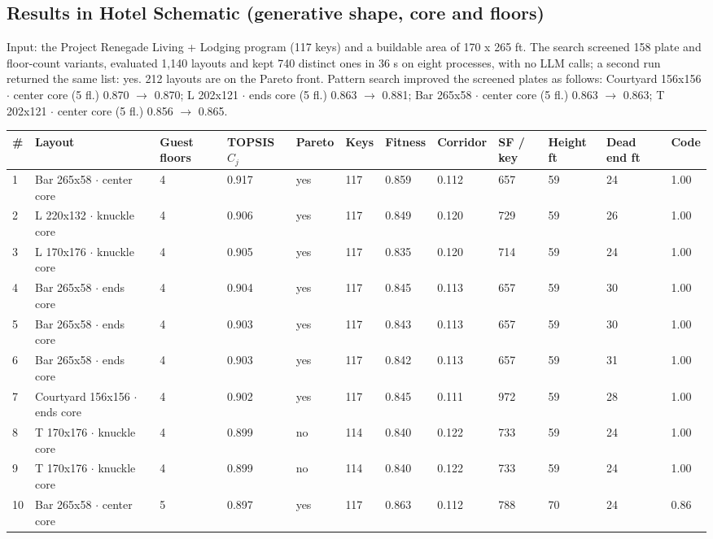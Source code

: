 \documentclass[10pt]{article}
\begin{document}
\subsection{Results in Hotel Schematic (generative shape, core and floors)}\label{sec:opthotel}
Input: the Project Renegade Living + Lodging program (117 keys) and a buildable area of
170 x 265 ft. The search screened 158 plate and floor-count variants,
evaluated 1,140 layouts and kept 740 distinct ones in 36 s on eight
processes, with no LLM calls; a second run returned the same list: yes.
212 layouts are on the Pareto front. Pattern search improved the screened plates as follows:
Courtyard 156x156 $\cdot$ center core (5 fl.) 0.870 $\to$ 0.870; L 202x121 $\cdot$ ends core (5 fl.) 0.863 $\to$ 0.881; Bar 265x58 $\cdot$ center core (5 fl.) 0.863 $\to$ 0.863; T 202x121 $\cdot$ center core (5 fl.) 0.856 $\to$ 0.865.
\begingroup{}\endgroup
{\small\begin{longtable}{p{0.4cm}p{4.2cm}p{1.0cm}p{1.2cm}p{0.9cm}p{0.8cm}p{1.0cm}p{1.1cm}p{0.9cm}p{0.9cm}p{1.0cm}p{0.8cm}}
\toprule
\textbf{\#} & \textbf{Layout} & \textbf{Guest floors} & \textbf{TOPSIS $C_j$} & \textbf{Pareto} & \textbf{Keys} & \textbf{Fitness} & \textbf{Corridor} & \textbf{SF / key} & \textbf{Height ft} & \textbf{Dead end ft} & \textbf{Code} \\ \midrule \endhead
1 & Bar 265x58 $\cdot$ center core & 4 & 0.917 & yes & 117 & 0.859 & 0.112 & 657 & 59 & 24 & 1.00 \\
2 & L 220x132 $\cdot$ knuckle core & 4 & 0.906 & yes & 117 & 0.849 & 0.120 & 729 & 59 & 26 & 1.00 \\
3 & L 170x176 $\cdot$ knuckle core & 4 & 0.905 & yes & 117 & 0.835 & 0.120 & 714 & 59 & 24 & 1.00 \\
4 & Bar 265x58 $\cdot$ ends core & 4 & 0.904 & yes & 117 & 0.845 & 0.113 & 657 & 59 & 30 & 1.00 \\
5 & Bar 265x58 $\cdot$ ends core & 4 & 0.903 & yes & 117 & 0.843 & 0.113 & 657 & 59 & 30 & 1.00 \\
6 & Bar 265x58 $\cdot$ ends core & 4 & 0.903 & yes & 117 & 0.842 & 0.113 & 657 & 59 & 31 & 1.00 \\
7 & Courtyard 156x156 $\cdot$ ends core & 4 & 0.902 & yes & 117 & 0.845 & 0.111 & 972 & 59 & 28 & 1.00 \\
8 & T 170x176 $\cdot$ knuckle core & 4 & 0.899 & no & 114 & 0.840 & 0.122 & 733 & 59 & 24 & 1.00 \\
9 & T 170x176 $\cdot$ knuckle core & 4 & 0.899 & no & 114 & 0.840 & 0.122 & 733 & 59 & 24 & 1.00 \\
10 & Bar 265x58 $\cdot$ center core & 5 & 0.897 & yes & 117 & 0.863 & 0.112 & 788 & 70 & 24 & 0.86 \\
\bottomrule
\end{longtable}}
\end{document}
